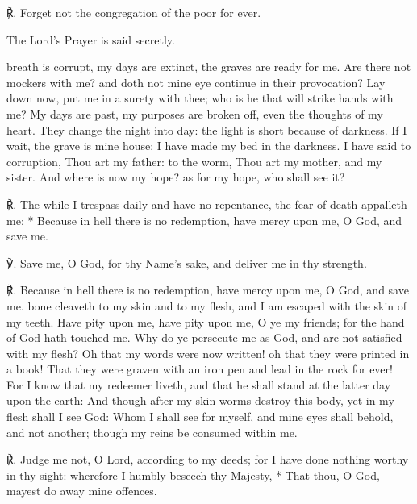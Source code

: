 ℟. Forget not the congregation of the poor for ever.\par
\begin{rubric}
The Lord's Prayer is said secretly.
\end{rubric}
 breath is corrupt, my days are extinct, the graves are ready for me. Are there not mockers with me? and doth not mine eye continue in their provocation? Lay down now, put me in a surety with thee; who is he that will strike hands with me? My days are past, my purposes are broken off, even the thoughts of my heart. They change the night into day: the light is short because of darkness. If I wait, the grave is mine house: I have made my bed in the darkness. I have said to corruption, Thou art my father: to the worm, Thou art my mother, and my sister. And where is now my hope? as for my hope, who shall see it?\par
℟. The while I trespass daily {\dag} and have no repentance, the fear of death appalleth me: * Because in hell there is no redemption, have mercy upon me, O God, and save me.\par
℣. Save me, O God, for thy Name's sake, and deliver me in thy strength.\par
℟. Because in hell there is no redemption, have mercy upon me, O God, and save me.
 bone cleaveth to my skin and to my flesh, and I am escaped with the skin of my teeth. Have pity upon me, have pity upon me, O ye my friends; for the hand of God hath touched me. Why do ye persecute me as God, and are not satisfied with my flesh? Oh that my words were now written! oh that they were printed in a book! That they were graven with an iron pen and lead in the rock for ever! For I know that my redeemer liveth, and that he shall stand at the latter day upon the earth: And though after my skin worms destroy this body, yet in my flesh shall I see God: Whom I shall see for myself, and mine eyes shall behold, and not another; though my reins be consumed within me.\par
℟. Judge me not, {\dag} O Lord, according to my deeds; for I have done nothing worthy in thy sight: wherefore I humbly beseech thy Majesty, * That thou, O God, mayest do away mine offences.\par
